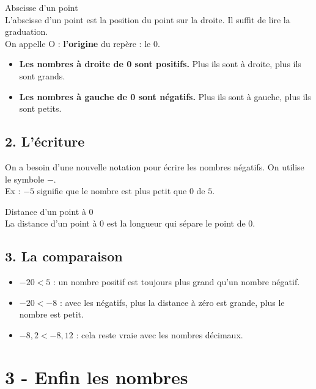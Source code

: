 \begin{Definition}{Abscisse d'un point}\\
  L'abscisse d'un point est la position du point sur la droite. Il suffit de lire la graduation.\\
  On appelle O : \textbf{l'origine} du repère : le 0.
\end{Definition}


\begin{itemize}[label={$\bullet$}]
  \item \textbf{Les nombres à droite de 0 sont positifs.} Plus ils sont à droite, plus ils sont grands. 
  \item \textbf{Les nombres à gauche de 0 sont négatifs.} Plus ils sont à gauche, plus ils sont petits.
\end{itemize}   

\subsection*{2. L'écriture}

On a besoin d'une nouvelle notation pour écrire les nombres négatifs. On utilise le symbole $-$.\\

Ex : $-5$ signifie que le nombre est plus petit que $0$ de $5$.

\begin{Definition}{Distance d'un point à 0}\\
  La distance d'un point à 0 est la longueur qui sépare le point de 0.
\end{Definition}

\subsection*{3. La comparaison}

\begin{itemize}[label={$\bullet$}]
  \item $ -20 < 5$ : un nombre positif est toujours plus grand qu'un nombre négatif.
  \item $ -20 < -8$ : avec les négatifs, plus la distance à zéro est grande, plus le nombre est petit.
  \item $ -8,2 < -8,12$ : cela reste vraie avec les nombres décimaux.
\end{itemize}   

\section*{3 - Enfin les nombres}

